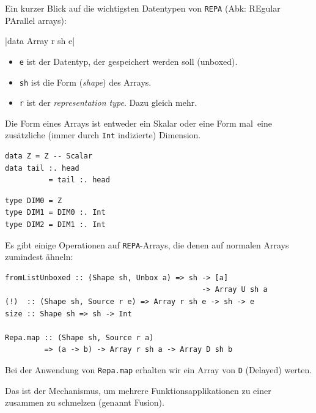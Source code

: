 \documentclass{beamer}
\begin{document}
\begin{frame}[fragile]
Ein kurzer Blick auf die wichtigsten Datentypen von \texttt{REPA} (Abk: REgular PArallel arrays):\pause\smallskip

|data Array r sh e|

\begin{itemize}
\item \texttt{e} ist der Datentyp, der gespeichert werden soll (unboxed).\pause
\item \texttt{sh} ist die Form (\emph{shape}) des Arrays.\pause
\item \texttt{r} ist der \emph{representation type}. Dazu gleich mehr.\pause
\end{itemize}

Die Form eines Arrays ist entweder ein Skalar oder eine Form \glqq mal\grqq\ eine zusätzliche (immer durch \texttt{Int} indizierte) Dimension.

\begin{multicols}{2}

\begin{verbatim}
data Z = Z -- Scalar
data tail :. head
          = tail :. head
\end{verbatim}

\columnbreak
\pause

\begin{verbatim}
type DIM0 = Z
type DIM1 = DIM0 :. Int
type DIM2 = DIM1 :. Int
\end{verbatim}
\pause

\end{multicols}

\end{frame}



\begin{frame}[fragile]

Es gibt einige Operationen auf \texttt{REPA}-Arrays, die denen auf normalen Arrays zumindest ähneln:\pause\bigskip

\begin{verbatim}
fromListUnboxed :: (Shape sh, Unbox a) => sh -> [a] 
                                             -> Array U sh a
(!)  :: (Shape sh, Source r e) => Array r sh e -> sh -> e
size :: Shape sh => sh -> Int

Repa.map :: (Shape sh, Source r a)
         => (a -> b) -> Array r sh a -> Array D sh b
\end{verbatim}
\pause
\bigskip

Bei der Anwendung von \texttt{Repa.map} erhalten wir ein Array von \texttt{D} (Delayed) werten.

Das ist der Mechanismus, um mehrere Funktionsapplikationen zu einer zusammen zu schmelzen (genannt \glqq Fusion\grqq ).

\end{frame}
\end{document}
